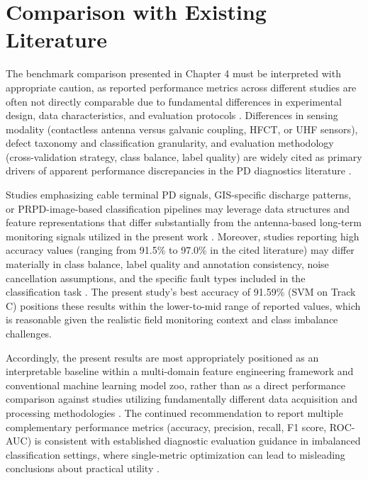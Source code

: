 \section{Comparison with Existing Literature}

The benchmark comparison presented in Chapter 4 must be interpreted with appropriate caution, as reported performance metrics across different studies are often not directly comparable due to fundamental differences in experimental design, data characteristics, and evaluation protocols \parencite{Aldosari_2023, Sikorski_2025}. Differences in sensing modality (contactless antenna versus galvanic coupling, HFCT, or UHF sensors), defect taxonomy and classification granularity, and evaluation methodology (cross-validation strategy, class balance, label quality) are widely cited as primary drivers of apparent performance discrepancies in the PD diagnostics literature \parencite{Vera_2023_1, Long_2024}.

Studies emphasizing cable terminal PD signals, GIS-specific discharge patterns, or PRPD-image-based classification pipelines may leverage data structures and feature representations that differ substantially from the antenna-based long-term monitoring signals utilized in the present work \parencite{Sian_2023, Cai_2025}. Moreover, studies reporting high accuracy values (ranging from 91.5\% to 97.0\% in the cited literature) may differ materially in class balance, label quality and annotation consistency, noise cancellation assumptions, and the specific fault types included in the classification task \parencite{Zemouri_2023_1, Friebe_2024}. The present study's best accuracy of 91.59\% (SVM on Track C) positions these results within the lower-to-mid range of reported values, which is reasonable given the realistic field monitoring context and class imbalance challenges.

Accordingly, the present results are most appropriately positioned as an interpretable baseline within a multi-domain feature engineering framework and conventional machine learning model zoo, rather than as a direct performance comparison against studies utilizing fundamentally different data acquisition and processing methodologies \parencite{Aldosari_2023, Srivastava_2023_1}. The continued recommendation to report multiple complementary performance metrics (accuracy, precision, recall, F1 score, ROC-AUC) is consistent with established diagnostic evaluation guidance in imbalanced classification settings, where single-metric optimization can lead to misleading conclusions about practical utility \parencite{Zemouri_2023_1, Adhikari_2024}.

